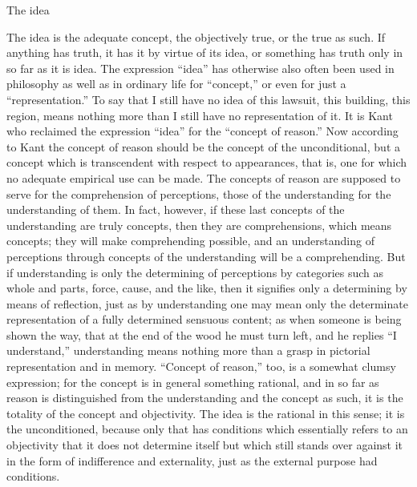 The idea

The idea is the adequate concept,
the objectively true,
or the true as such.
If anything has truth,
it has it by virtue of its idea,
or something has truth only
in so far as it is idea.
The expression “idea” has otherwise also often been used
in philosophy as well as in ordinary life for “concept,”
or even for just a “representation.”
To say that I still have no idea of
this lawsuit, this building, this region,
means nothing more than I still have no representation of it.
It is Kant who reclaimed the expression “idea”
for the “concept of reason.”
Now according to Kant the concept of reason
should be the concept of the unconditional,
but a concept which is transcendent with respect to appearances,
that is, one for which no adequate empirical use can be made.
The concepts of reason are supposed to serve
for the comprehension of perceptions,
those of the understanding for the understanding of them.
In fact, however, if these last
concepts of the understanding are truly concepts,
then they are comprehensions, which means concepts;
they will make comprehending possible,
and an understanding of perceptions
through concepts of the understanding
will be a comprehending.
But if understanding is only
the determining of perceptions by categories
such as whole and parts, force, cause, and the like,
then it signifies only a determining by means of reflection,
just as by understanding one may mean only the determinate
representation of a fully determined sensuous content;
as when someone is being shown the way, that at the end of the
wood he must turn left, and he replies “I understand,”
understanding means nothing more than a grasp
in pictorial representation and in memory.
“Concept of reason,” too, is a somewhat clumsy expression;
for the concept is in general something rational,
and in so far as reason is distinguished
from the understanding and the concept as such,
it is the totality of the concept and objectivity.
The idea is the rational in this sense;
it is the unconditioned,
because only that has conditions
which essentially refers to an objectivity
that it does not determine itself
but which still stands over against it
in the form of indifference and externality,
just as the external purpose had conditions.

